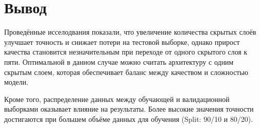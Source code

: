 \section*{Вывод}

Проведённые исселодвания показали, что увеличение количества скрытых слоёв улучшает точность и снижает потери на тестовой выборке, 
однако прирост качества становится незначительным при переходе от одного скрытого слоя к пяти. 
Оптимальной в данном случае можно считать архитектуру с одним скрытым слоем, которая обеспечивает баланс между качеством и сложностью модели.

Кроме того, распределение данных между обучающей и валидационной выборками оказывает влияние на результаты. 
Более высокие значения точности достигаются при большем объёме данных для обучения (Split: 90/10 и 80/20).

\clearpage

